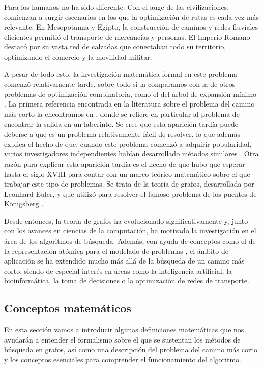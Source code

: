 \documentclass[a4paper,12pt]{article}
\begin{document}
Para los humanos no ha sido diferente. Con el auge de las civilizaciones, comienzan a surgir escenarios en los que la optimización de rutas es cada vez más relevante. En Mesopotamia y Egipto, la construcción de caminos y redes fluviales eficientes permitió el transporte de mercancías y personas. El Imperio Romano destacó por su vasta red de calzadas que conectaban todo su territorio, optimizando el comercio y la movilidad militar.

A pesar de todo esto, la investigación matemática formal en este problema comenzó relativamente tarde, sobre todo si la comparamos con la de otros problemas de optimización combinatoria, como el del árbol de expansión mínimo \cite{boruuvka1926jistem}. La primera referencia encontrada en la literatura sobre el problema del camino más corto la encontramos en \cite{wiener1873ueber}, donde se refiere en particular al problema de encontrar la salida en un laberinto. Se cree que esta aparición tardía puede deberse a que es un problema relativamente fácil de resolver, lo que además explica el hecho de que, cuando este problema comenzó a adquirir popularidad, varios investigadores independientes habían desarrollado métodos similares \cite{schrijver2012history}. Otra razón para explicar esta aparición tardía es el hecho de que hubo que esperar hasta el siglo XVIII para contar con un marco teórico matemático sobre el que trabajar este tipo de problemas. Se trata de la teoría de grafos, desarrollada por Leonhard Euler, y que utilizó para resolver el famoso problema de los puentes de Königsberg \cite{euler1741solutio}.

Desde entonces, la teoría de grafos ha evolucionado significativamente y, junto con los avances en ciencias de la computación, ha motivado la investigación en el área de los algoritmos de búsqueda. Además, con ayuda de conceptos como el de la representación atómica para el modelado de problemas \cite[p. 57]{russell2016artificial}, el ámbito de aplicación se ha extendido mucho más allá de la búsqueda de un camino más corto, siendo de especial interés en áreas como la inteligencia artificial, la bioinformática, la toma de decisiones o la optimización de redes de transporte.

\subsection{Conceptos matemáticos} \label{sec:conceptos}

En esta sección vamos a introducir algunas definiciones matemáticas que nos ayudarán a entender el formalismo sobre el que se sustentan los métodos de búsqueda en grafos, así como una descripción del problema del camino más corto y los conceptos esenciales para comprender el funcionamiento del algoritmo.
\end{document}

